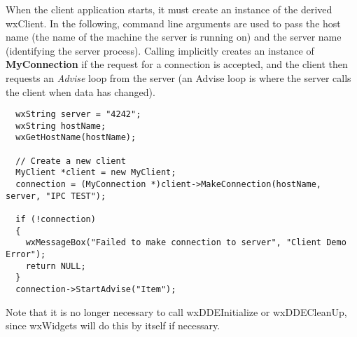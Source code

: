 When the client application starts, it must create an instance of
the derived wxClient. In the following, command line arguments
are used to pass the host name (the name of the machine the
server is running on) and the server name (identifying the server
process). Calling
\rtfsp
implicitly creates an instance of {\bf MyConnection} if the
request for a connection is accepted, and the client then
requests an {\it Advise} loop from the server (an Advise loop is
where the server calls the client when data has changed).

\begin{verbatim}
  wxString server = "4242";
  wxString hostName;
  wxGetHostName(hostName);

  // Create a new client
  MyClient *client = new MyClient;
  connection = (MyConnection *)client->MakeConnection(hostName, server, "IPC TEST");

  if (!connection)
  {
    wxMessageBox("Failed to make connection to server", "Client Demo Error");
    return NULL;
  }
  connection->StartAdvise("Item");
\end{verbatim}

Note that it is no longer necessary to call wxDDEInitialize or wxDDECleanUp, since
wxWidgets will do this by itself if necessary.

